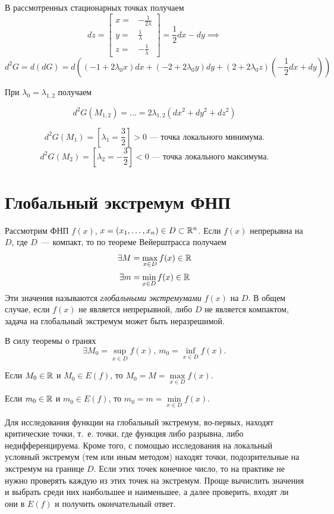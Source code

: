 \documentclass[../../main.tex]{subfiles}
\begin{document}
\begin{exmp}
	В рассмотренных стационарных точках получаем
	\[ dz = \left[
	\begin{array}{rl}
	x =& -\frac{1}{2\lambda} \\
	y =& \frac{1}{\lambda} \\
	z =& -\frac{1}{\lambda}
	\end{array}
	\right] = \frac{1}{2}dx - dy \implies\] 
	\[d^2G = d\left(dG\right) = 
	d\left(\left(-1 + 2\lambda_0x\right)dx + \left(-2 
	+ 2\lambda_0y\right)dy 
	+ \left(2 + 2\lambda_0z\right)\left(-\frac{1}{2}dx + dy\right)\right) \]
	
	При $\lambda_0 = \lambda_{1, 2}$ получаем
	
	\[d^2G(M_{1, 2}) = \dots = 2\lambda_{1, 2}(dx^2 + dy^2 + dz^2)\]
	
	\[d^2G(M_1) = \left[\lambda_1 = \frac{3}{2}\right] > 0
	\text{~--- точка локального минимума.}\]
	\[d^2G(M_2) = \left[\lambda_2 = -\frac{3}{2}\right] < 0
	\text{~--- точка локального максимума.}\]
	\end{exmp}
	
	\section{Глобальный экстремум ФНП}
	
	Рассмотрим ФНП $f(x)$, $x = (x_1, \dots, 
	x_n) \in D \subset \mathbb{R}^n$. Если $f(x)$ непрерывна на $D$,
	где $D$~--- компакт, то по теореме Вейерштрасса получаем
	\[ \exists M = \max\limits_{x \in D} f(x) \in \mathbb{R} \] 
	\[ \exists m = \min\limits_{x \in D} f(x) \in \mathbb{R} \]
	Эти значения называются \emph{глобальными экстремумами} $f(x)$ на $D$.
	В общем случае, если $f(x)$ не является непрерывной, либо $D$ 
	не является компактом, задача на глобальный экстремум может быть неразрешимой.
	
	В силу теоремы о гранях
	\[ \exists M_0 = \sup\limits_{x \in D} f(x),\
	m_0 = \inf\limits_{x \in D} f(x). \]
	
	Если $M_0 \in \mathbb{R}$ и $M_0 \in E(f)$, то $M_0 = M = 
	\max\limits_{x \in D} f(x)$.
	
	Если $m_0 \in \mathbb{R}$ и $m_0 \in E(f)$, то $m_0 = m = 
	\min\limits_{x \in D} f(x)$.
	
	Для исследования функции на глобальный экстремум, во-первых, 
	находят критические точки, т.~е. точки, 
	где функция либо разрывна, либо недифференцируема. Кроме того, с помощью 
	исследования на локальный условный экстремум (тем или иным методом)
	находят точки, подозрительные на экстремум на границе $D$.
	Если этих точек конечное число, то на практике не нужно проверять каждую из 
	этих точек на экстремум.
	Проще вычислить значения и выбрать среди них наибольшее и наименьшее, 
	а далее проверить, входят ли они в $E(f)$ и 
	получить окончательный ответ.
	
\end{document}
